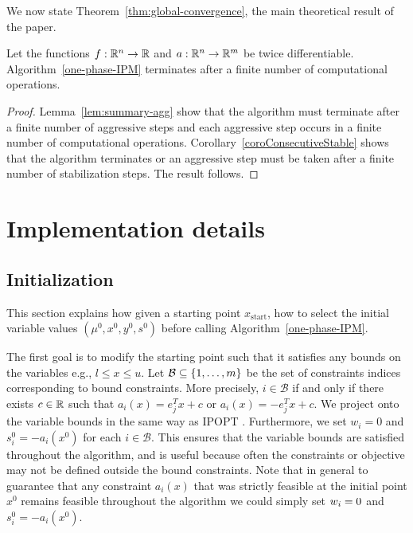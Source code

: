 \documentclass{article}
\begin{document}
We now state Theorem~\ref{thm:global-convergence}, the main theoretical result of the paper.

\begin{theorem}\label{thm:global-convergence}
Let the functions $f : \mathbb{R}^{n} \rightarrow \mathbb{R}$ and $a : \mathbb{R}^{n} \rightarrow \mathbb{R}^{m}$ be twice differentiable.
Algorithm~\ref{one-phase-IPM} terminates after a finite number of computational operations.
\end{theorem}

\begin{proof}
Lemma~\ref{lem:summary-agg} show that the algorithm must terminate after a finite number of aggressive steps and each aggressive step occurs in a finite number of computational operations.
Corollary~\ref{coroConsecutiveStable} shows that the algorithm terminates or an aggressive step must be taken after a finite number of stabilization steps. The result follows.
\end{proof}



\section{Implementation details}\label{sec:implementation-details}


\subsection{Initialization}\label{sec:initialization}


This section explains how given a starting point $x_{\text{start}}$, how to select the initial variable values $(\mu^0,x^0, y^0, s^0)$ before calling Algorithm~\ref{one-phase-IPM}.

The first goal is to modify the starting point such that it satisfies any bounds on the variables e.g., $l \le x \le u$. Let $\mathcal{B} \subseteq \{ 1, \dots, m \}$ be the set of constraints indices corresponding to bound constraints. More precisely, $i \in \mathcal{B}$ if and only if there exists $c \in \mathbb{R}$ such that $a_i(x) = e_j^T x + c$ or $a_i(x) = -e_j^T x + c$. We project onto the variable bounds in the same way as IPOPT \cite[Section 3.7]{wachter2006implementation}. Furthermore, we set $w_i = 0$ and $s_i^{0} = -a_i(x^0)$ for each $i \in \mathcal{B}$. This ensures that the variable bounds are satisfied throughout the algorithm, and is useful because often the constraints or objective may not be defined outside the bound constraints. Note that in general to guarantee that any constraint $a_i(x)$ that was strictly feasible at the initial point $x^{0}$ remains feasible throughout the algorithm we could simply set $w_i = 0$ and $s_i^{0} = -a_i(x^0)$.
 
\end{document}
